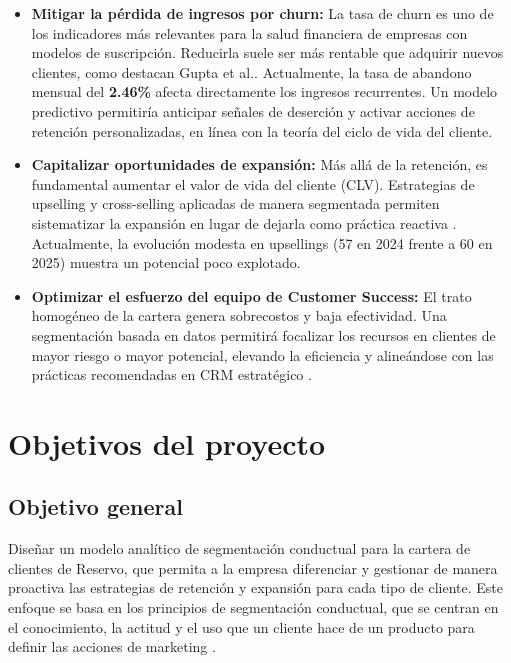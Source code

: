\begin{itemize}
    \item \textbf{Mitigar la pérdida de ingresos por churn:} La tasa de churn es uno de los indicadores más relevantes para la salud financiera de empresas con modelos de suscripción. Reducirla suele ser más rentable que adquirir nuevos clientes, como destacan Gupta et al.\citep{Gupta2006}. Actualmente, la tasa de abandono mensual del \textbf{2.46\%} afecta directamente los ingresos recurrentes. Un modelo predictivo permitiría anticipar señales de deserción y activar acciones de retención personalizadas, en línea con la teoría del ciclo de vida del cliente\citep{Lemmens2008}.

    \item \textbf{Capitalizar oportunidades de expansión:} Más allá de la retención, es fundamental aumentar el valor de vida del cliente (CLV). Estrategias de upselling y cross-selling aplicadas de manera segmentada permiten sistematizar la expansión en lugar de dejarla como práctica reactiva \citep{Kumar2010}. Actualmente, la evolución modesta en upsellings (57 en 2024 frente a 60 en 2025) muestra un potencial poco explotado.

    \item \textbf{Optimizar el esfuerzo del equipo de Customer Success:} El trato homogéneo de la cartera genera sobrecostos y baja efectividad. Una segmentación basada en datos permitirá focalizar los recursos en clientes de mayor riesgo o mayor potencial, elevando la eficiencia y alineándose con las prácticas recomendadas en CRM estratégico \citep{Reinartz2004b}.

\end{itemize}



\newpage
\section{Objetivos del proyecto}

\subsection{Objetivo general}

Diseñar un modelo analítico de segmentación conductual para la cartera de clientes de Reservo, que permita a la empresa diferenciar y gestionar de manera proactiva las estrategias de retención y expansión para cada tipo de cliente. Este enfoque se basa en los principios de segmentación conductual, que se centran en el conocimiento, la actitud y el uso que un cliente hace de un producto para definir las acciones de marketing \citep{Kotler2016}.

